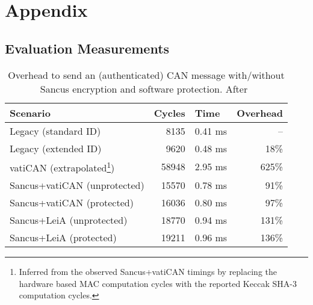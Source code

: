 

\section*{Appendix}


\subsection{Evaluation Measurements}\label{app:evaluation_measurements}

\begin{table}[h]
    \centering
    \begin{tabular}{@{}lrrr@{}}
    \toprule
    \textbf{Scenario}            & \multicolumn{1}{l}{\textbf{Cycles}} & \multicolumn{1}{l}{\textbf{Time}} & \multicolumn{1}{l}{\textbf{Overhead}} \\ \midrule
    Legacy (standard ID)         & 8135                                & 0.41 ms                           & –                                     \\
    Legacy (extended ID)         & 9620                                & 0.48 ms                           & 18\%                                  \\
    vatiCAN (extrapolated\footnote{\label{footnote-label}Inferred from the observed Sancus+vatiCAN timings by replacing the hardware based MAC computation cycles with the reported Keccak \mbox{SHA-3} computation cycles.})      & 58948                               & 2.95 ms                           & 625\%                                 \\
    Sancus+vatiCAN (unprotected) & 15570                               & 0.78 ms                           & 91\%                                  \\
    Sancus+vatiCAN (protected)   & 16036                               & 0.80 ms                           & 97\%                                  \\
    Sancus+LeiA (unprotected)    & 18770                               & 0.94 ms                           & 131\%                                 \\
    Sancus+LeiA (protected)      & 19211                               & 0.96 ms                           & 136\%                                 \\ \bottomrule
    \end{tabular}
    \caption{Overhead to send an (authenticated) CAN message with/without Sancus encryption and software protection. After~\cite{VanBulck2017}}
\end{table}

